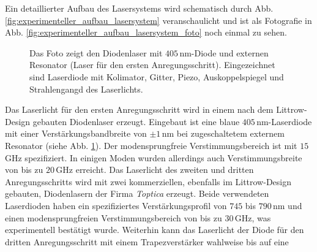 Ein detaillierter Aufbau des Lasersystems wird schematisch durch Abb.
\ref{fig:experimenteller_aufbau_lasersystem} veranschaulicht und ist als
Fotografie in Abb. \ref{fig:experimenteller_aufbau_lasersystem_foto} noch einmal
zu sehen.\par
\begin{figure}[h]
 	\centering
	\caption[Diodenlaser - Foto]{Das Foto zeigt den Diodenlaser mit
	$405\,$nm-Diode und externen
	Resonator (Laser für den ersten
	Anregungsschritt).
	Eingezeichnet sind
	Laserdiode mit Kolimator,
	Gitter, Piezo,
	Auskoppelspiegel und
	Strahlengangd des
	Laserlichts.}\label{fig:experimenteller_aufbau_diodenlaser_foto}
\end{figure}
Das Laserlicht für den ersten Anregungsschritt wird in einem nach dem
Littrow-Design gebauten Diodenlaser erzeugt. Eingebaut ist eine blaue
$405\,$nm-Laserdiode mit einer Verstärkungsbandbreite von $\pm1\,$nm bei
zugeschaltetem externem Resonator (siehe Abb.
\ref{fig:experimenteller_aufbau_diodenlaser_foto}). Der modensprungfreie
Verstimmungsbereich ist mit $15\,$GHz spezifiziert. In einigen Moden wurden
allerdings auch Verstimmungsbreite von bis zu $20\,$GHz erreicht. Das Laserlicht
des zweiten und dritten Anregungsschritts wird mit zwei kommerziellen, ebenfalls im Littrow-Design gebauten, Diodenlasern der Firma \textit{Toptica} erzeugt.
Beide verwendeten Laserdioden haben ein spezifiziertes Verstärkungsprofil von
$745$ bis $790\,$nm und einen modensprungfreien Verstimmungsbereich von bis
zu $30\,$GHz, was experimentell bestätigt wurde. Weiterhin kann das Laserlicht
der Diode für den dritten Anregungsschritt mit einem Trapezverstärker wahlweise bis auf eine
